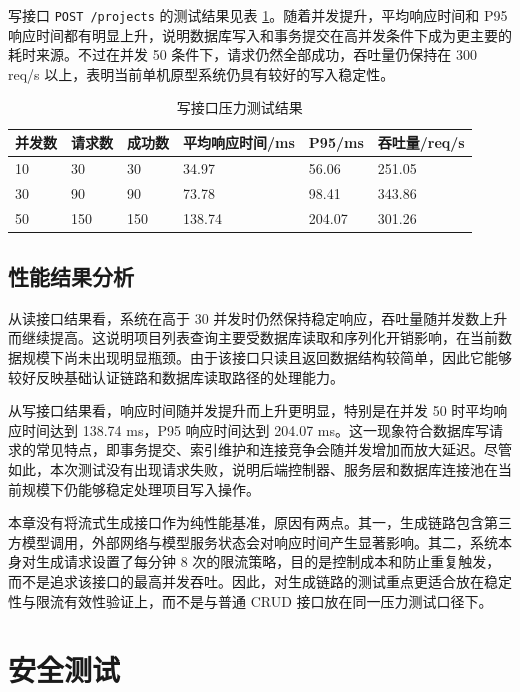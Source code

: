 写接口 \texttt{POST /projects} 的测试结果见表 \ref{tab:chapter6-performance-write}。随着并发提升，平均响应时间和 P95 响应时间都有明显上升，说明数据库写入和事务提交在高并发条件下成为更主要的耗时来源。不过在并发 50 条件下，请求仍然全部成功，吞吐量仍保持在 300 req/s 以上，表明当前单机原型系统仍具有较好的写入稳定性。

\begin{table}[!htbp]
\centering
\caption{写接口压力测试结果}
\label{tab:chapter6-performance-write}
\small
\begin{tabular}{@{}p{}p{}p{}p{}p{}p{}@{}}
\toprule
并发数 & 请求数 & 成功数 & 平均响应时间/ms & P95/ms & 吞吐量/req/s \\
\midrule
10 & 30 & 30 & 34.97 & 56.06 & 251.05 \\
30 & 90 & 90 & 73.78 & 98.41 & 343.86 \\
50 & 150 & 150 & 138.74 & 204.07 & 301.26 \\
\bottomrule
\end{tabular}
\end{table}

\subsection{性能结果分析}
从读接口结果看，系统在高于 30 并发时仍然保持稳定响应，吞吐量随并发数上升而继续提高。这说明项目列表查询主要受数据库读取和序列化开销影响，在当前数据规模下尚未出现明显瓶颈。由于该接口只读且返回数据结构较简单，因此它能够较好反映基础认证链路和数据库读取路径的处理能力。

从写接口结果看，响应时间随并发提升而上升更明显，特别是在并发 50 时平均响应时间达到 138.74 ms，P95 响应时间达到 204.07 ms。这一现象符合数据库写请求的常见特点，即事务提交、索引维护和连接竞争会随并发增加而放大延迟。尽管如此，本次测试没有出现请求失败，说明后端控制器、服务层和数据库连接池在当前规模下仍能够稳定处理项目写入操作。

本章没有将流式生成接口作为纯性能基准，原因有两点。其一，生成链路包含第三方模型调用，外部网络与模型服务状态会对响应时间产生显著影响。其二，系统本身对生成请求设置了每分钟 8 次的限流策略，目的是控制成本和防止重复触发，而不是追求该接口的最高并发吞吐。因此，对生成链路的测试重点更适合放在稳定性与限流有效性验证上，而不是与普通 CRUD 接口放在同一压力测试口径下。

\section{安全测试}

